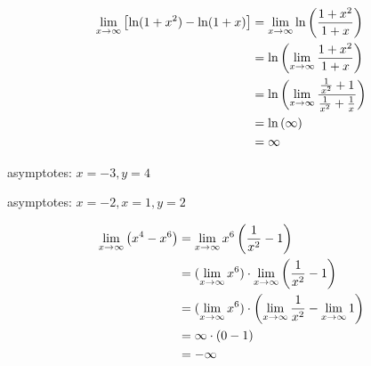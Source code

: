 \documentclass{../../../classes/anal}
\begin{document}

    \begin{equation*}
        \begin{aligned}
            \lim_{x\to\infty}\left[\ln(1 + x^2) - \ln(1 + x)\right]
            &= \lim_{x\to\infty}\ln\left({1 + x^2 \over 1 + x}\right) \\
            &= \ln\left(\lim_{x\to\infty}{1 + x^2 \over 1 + x}\right) \\
            &= \ln\left(\lim_{x\to\infty}{{1 \over x^2} + 1 \over {1 \over x^2} + {1 \over x}}\right) \\
            &= \ln\left(\infty\right) \\
            &= \infty
        \end{aligned}
    \end{equation*}


    asymptotes: \(x = -3, y = 4\)


    asymptotes: \(x = -2, x = 1, y = 2\)


    \begin{equation}
        \begin{aligned}
            \lim_{x\to\infty} \left(x^4 - x^6\right)
            &= \lim_{x\to\infty} x^6\left({1 \over x^2} - 1\right) \\
            &= (\lim_{x\to\infty} x^6) \cdot \lim_{x\to\infty}\left({1 \over x^2} - 1\right) \\
            &= (\lim_{x\to\infty} x^6) \cdot \left(\lim_{x\to\infty}{1 \over x^2} - \lim_{x\to\infty}1\right) \\
            &= \infty \cdot \left(0 - 1\right) \\
            &= -\infty \\
        \end{aligned}
    \end{equation}

\end{document}
